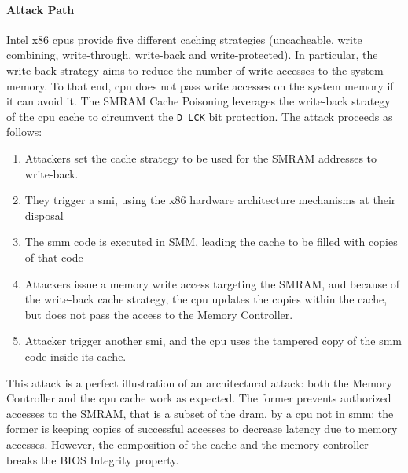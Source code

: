 \paragraph{Attack Path}
%
Intel x86 \acp{cpu} provide five different caching strategies (uncacheable,
write combining, write-through, write-back and write-protected). 
%
In particular, the write-back strategy aims to reduce the number of write
accesses to the system memory.
%
To that end, \ac{cpu} does not pass write accesses on the system memory if it
can avoid it. 
%
The SMRAM Cache Poisoning leverages the write-back strategy of the \ac{cpu}
cache to circumvent the \texttt{D\_LCK} bit protection.
%
The attack proceeds as follows:

\begin{enumerate}
\item Attackers set the cache strategy to be used for the SMRAM addresses to
  write-back.

%
\item They trigger a \ac{smi}, using the x86 hardware architecture mechanisms at
  their disposal
%
\item The \ac{smm} code is executed in SMM, leading the cache to be filled with
  copies of that code
%
\item Attackers issue a memory write access targeting the SMRAM, and because of
  the write-back cache strategy, the \ac{cpu} updates the copies within the
  cache, but does not pass the access to the Memory Controller.
%
\item Attacker trigger another \ac{smi}, and the \ac{cpu} uses the tampered copy
  of the \ac{smm} code inside its cache.
\end{enumerate}
%
This attack is a perfect illustration of an architectural attack:
%
both the Memory Controller and the \ac{cpu} cache work as expected.
%
The former prevents authorized accesses to the SMRAM, that is a subset of the
\ac{dram}, by a \ac{cpu} not in \ac{smm};
%
the former is keeping copies of successful accesses to decrease latency due to
memory accesses.
%
However, the composition of the cache and the memory controller breaks the BIOS
Integrity property.

